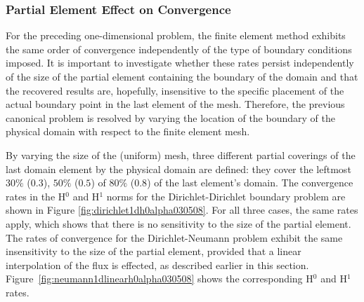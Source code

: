 \documentclass[12pt,twoside]{article}
\begin{document}
\subsubsection{Partial Element Effect on Convergence}
\par
For the preceding one-dimensional problem, the finite element method 
exhibits the same order of convergence independently of the type 
of boundary conditions imposed. It is important to investigate whether
these rates persist independently of the size of the partial element
containing the boundary of the domain and that the recovered results
are, hopefully, insensitive to the specific placement of the actual
boundary point in the last element of the mesh. Therefore, the
previous canonical problem is resolved by varying the location of the
boundary of the physical domain with respect to the finite element mesh. 
\par
By varying the size of the (uniform) mesh, three different partial coverings of
the last domain element by the physical domain are defined: they cover 
the leftmost $30\%$ ($0.3$), $50\%$ ($0.5$) of $80\%$ ($0.8$) of the
last element's domain. The convergence rates in the H$^0$ and H$^1$ norms 
for the Dirichlet-Dirichlet boundary problem are shown 
in Figure \ref{fig:dirichlet1dh0alpha030508}. For all three cases,
the same rates apply, which shows that there is no sensitivity to the
size of the partial element. \\
The rates of convergence for the Dirichlet-Neumann problem exhibit the
same insensitivity to the size of the partial element, provided that
a linear interpolation of the flux is effected, as described earlier
in this section. Figure~\ref{fig:neumann1dlinearh0alpha030508} shows the corresponding
H$^0$ and H$^1$ rates. \\
\end{document}
